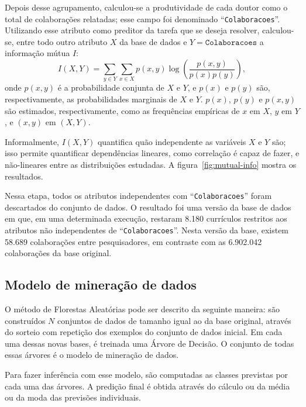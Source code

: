 \documentclass[12pt]{article}
\begin{document}
Depois desse agrupamento, calculou-se a produtividade de cada doutor como o total de colaborações relatadas; esse campo foi denominado ``\texttt{Colaboracoes}''.
Utilizando esse atributo como preditor da tarefa que se deseja resolver, calculou-se, entre todo outro atributo $X$ da base de dados e $Y = \texttt{Colaboracoes}$ a informação mútua $I$:
\begin{equation}
  I(X, Y) = \sum_{y \in Y} \sum_{x \in X} p(x, y) \log \left( \frac{p(x, y)}{p(x)p(y)} \right),
\end{equation}
onde $p(x, y)$ é a probabilidade conjunta de $X$ e $Y$, e $p(x)$ e $p(y)$ são, respectivamente, as probabilidades marginais de $X$ e $Y$.
$p(x)$, $p(y)$ e $p(x, y)$ são estimados, respectivamente, como as frequências empíricas de $x$ em $X$, $y$ em $Y$, e $(x, y)$ em $(X, Y)$.

Informalmente, $I(X, Y)$ quantifica quão independente as variáveis $X$ e $Y$ são; isso permite quantificar dependências lineares, como correlação é capaz de fazer, e não-lineares entre as distribuições estudadas.
A figura~\ref{fig:mutual-info} mostra os resultados.

Nessa etapa, todos os atributos independentes com ``\texttt{Colaboracoes}'' foram descartados do conjunto de dados.
O resultado foi uma versão da base de dados em que, em uma determinada execução, restaram 8.180 currículos restritos aos atributos não independentes de ``\texttt{Colaboracoes}''.
Nesta versão da base, existem 58.689 colaborações entre pesquisadores, em contraste com as 6.902.042 colaborações da base original.


\subsection{Modelo de mineração de dados}
\label{sec:datamining}

O método de Florestas Aleatórias pode ser descrito da seguinte maneira: são construídos $N$ conjuntos de dados de tamanho igual ao da base original, através do sorteio com repetição dos exemplos do conjunto de dados inicial.
Em cada uma dessas novas bases, é treinada uma Árvore de Decisão.
O conjunto de todas essas árvores é o modelo de mineração de dados.

Para fazer inferência com esse modelo, são computadas as classes previstas por cada uma das árvores.
A predição final é obtida através do cálculo ou da média ou da moda das previsões individuais.
\end{document}
